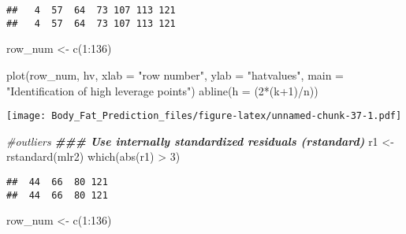 \documentclass[
]{article}
\newenvironment{Shaded}{\begin{snugshade}}{\end{snugshade}}
\newcommand{\AttributeTok}[1]{\textcolor[rgb]{0.77,0.63,0.00}{#1}}
\newcommand{\CommentTok}[1]{\textcolor[rgb]{0.56,0.35,0.01}{\textit{#1}}}
\newcommand{\DecValTok}[1]{\textcolor[rgb]{0.00,0.00,0.81}{#1}}
\newcommand{\DocumentationTok}[1]{\textcolor[rgb]{0.56,0.35,0.01}{\textbf{\textit{#1}}}}
\newcommand{\FunctionTok}[1]{\textcolor[rgb]{0.00,0.00,0.00}{#1}}
\newcommand{\NormalTok}[1]{#1}
\newcommand{\OtherTok}[1]{\textcolor[rgb]{0.56,0.35,0.01}{#1}}
\newcommand{\SpecialCharTok}[1]{\textcolor[rgb]{0.00,0.00,0.00}{#1}}
\newcommand{\StringTok}[1]{\textcolor[rgb]{0.31,0.60,0.02}{#1}}
\begin{document}
\begin{verbatim}
##   4  57  64  73 107 113 121 
##   4  57  64  73 107 113 121
\end{verbatim}

\begin{Shaded}
\begin{Highlighting}[]
\NormalTok{row\_num }\OtherTok{\textless{}{-}} \FunctionTok{c}\NormalTok{(}\DecValTok{1}\SpecialCharTok{:}\DecValTok{136}\NormalTok{)}
\end{Highlighting}
\end{Shaded}

\begin{Shaded}
\begin{Highlighting}[]
\FunctionTok{plot}\NormalTok{(row\_num, hv, }\AttributeTok{xlab =} \StringTok{"row number"}\NormalTok{,}
     \AttributeTok{ylab =} \StringTok{"hatvalues"}\NormalTok{, }
     \AttributeTok{main =} \StringTok{"Identification of high leverage points"}\NormalTok{)}
\FunctionTok{abline}\NormalTok{(}\AttributeTok{h =}\NormalTok{ (}\DecValTok{2}\SpecialCharTok{*}\NormalTok{(k}\SpecialCharTok{+}\DecValTok{1}\NormalTok{)}\SpecialCharTok{/}\NormalTok{n))}
\end{Highlighting}
\end{Shaded}

\texttt{[image: Body\_Fat\_Prediction\_files/figure-latex/unnamed-chunk-37-1.pdf]}

\begin{Shaded}
\begin{Highlighting}[]
\CommentTok{\#outliers}
\DocumentationTok{\#\#\# Use internally standardized residuals (rstandard)}
\NormalTok{r1 }\OtherTok{\textless{}{-}} \FunctionTok{rstandard}\NormalTok{(mlr2)}
\FunctionTok{which}\NormalTok{(}\FunctionTok{abs}\NormalTok{(r1) }\SpecialCharTok{\textgreater{}} \DecValTok{3}\NormalTok{)}
\end{Highlighting}
\end{Shaded}

\begin{verbatim}
##  44  66  80 121 
##  44  66  80 121
\end{verbatim}

\begin{Shaded}
\begin{Highlighting}[]
\NormalTok{row\_num }\OtherTok{\textless{}{-}} \FunctionTok{c}\NormalTok{(}\DecValTok{1}\SpecialCharTok{:}\DecValTok{136}\NormalTok{)}
\end{Highlighting}
\end{Shaded}
\end{document}
